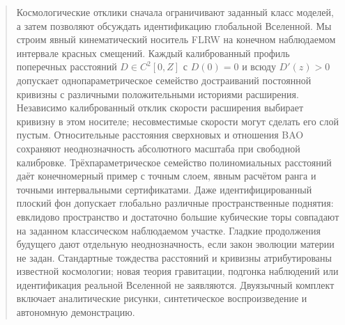 \maketitle
\begin{abstract}
{Космологические отклики сначала ограничивают заданный класс моделей, а затем позволяют обсуждать идентификацию глобальной Вселенной. Мы строим явный кинематический носитель FLRW на конечном наблюдаемом интервале красных смещений. Каждый калиброванный профиль поперечных расстояний $D\in C^2[0,Z]$ с $D(0)=0$ и всюду $D'(z)>0$ допускает однопараметрическое семейство достраиваний постоянной кривизны с различными положительными историями расширения. Независимо калиброванный отклик скорости расширения выбирает кривизну в этом носителе; несовместимые скорости могут сделать его слой пустым. Относительные расстояния сверхновых и отношения BAO сохраняют неоднозначность абсолютного масштаба при свободной калибровке. Трёхпараметрическое семейство полиномиальных расстояний даёт конечномерный пример с точным слоем, явным расчётом ранга и точными интервальными сертификатами. Даже идентифицированный плоский фон допускает глобально различные пространственные поднятия: евклидово пространство и достаточно большие кубические торы совпадают на заданном классическом наблюдаемом участке. Гладкие продолжения будущего дают отдельную неоднозначность, если закон эволюции материи не задан. Стандартные тождества расстояний и кривизны атрибутированы известной космологии; новая теория гравитации, подгонка наблюдений или идентификация реальной Вселенной не заявляются. Двуязычный комплект включает аналитические рисунки, синтетическое воспроизведение и автономную демонстрацию.}
\end{abstract}
